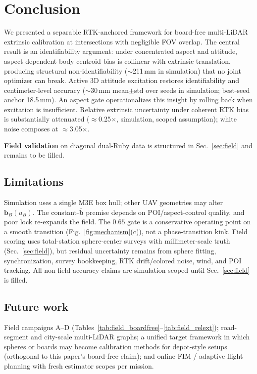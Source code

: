 \section{Conclusion}
\label{sec:conclusion}

We presented a separable RTK-anchored framework for board-free multi-LiDAR extrinsic
calibration at intersections with negligible FOV overlap.
The central result is an identifiability argument: under concentrated aspect and
attitude, aspect-dependent body-centroid bias is collinear with extrinsic translation,
producing structural non-identifiability ($\sim$211\,mm in simulation) that no joint
optimizer can break.
Active 3D attitude excitation restores identifiability and centimeter-level accuracy
($\sim$30\,mm mean$\pm$std over seeds in simulation; best-seed anchor 18.5\,mm).
An aspect gate operationalizes this insight by rolling back when excitation is
insufficient.
Relative extrinsic uncertainty under coherent RTK bias is substantially attenuated
($\approx$0.25$\times$, simulation, scoped assumption); white noise composes at
$\approx$3.05$\times$.

\textbf{Field validation} on diagonal dual-Ruby data is structured in
Sec.~\ref{sec:field} and remains to be filled.

\subsection{Limitations}
Simulation uses a single M3E box hull; other UAV geometries may alter
$\mathbf{b}_B(u_B)$.
The constant-$\bar{\mathbf{b}}$ premise depends on POI/aspect-control quality, and
poor lock re-expands the field.
The $0.65$ gate is a conservative operating point on a smooth transition
(Fig.~\ref{fig:mechanism}(c)), not a phase-transition kink.
Field scoring uses total-station sphere-center surveys with millimeter-scale truth
(Sec.~\ref{sec:field}), but residual uncertainty remains from sphere fitting,
synchronization, survey bookkeeping, RTK drift/colored noise, wind, and POI tracking.
All non-field accuracy claims are simulation-scoped until Sec.~\ref{sec:field} is
filled.

\subsection{Future work}
Field campaigns A--D (Tables~\ref{tab:field_boardfree}--\ref{tab:field_relext});
road-segment and city-scale multi-LiDAR graphs; a unified target framework in which
spheres or boards may become calibration methods for depot-style setups (orthogonal
to this paper's board-free claim); and online FIM / adaptive flight planning with
fresh estimator scopes per mission.
